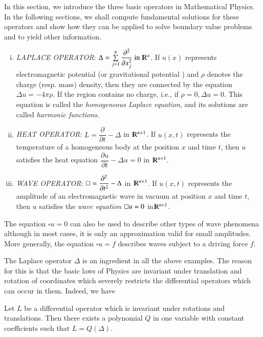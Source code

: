 In this section, we introduce the three basic operators in
Mathematical Physics. In the following sections, we shall compute
fundamental solutions for these operators and show how they can be
applied to solve boundary value problems and to yield other
information. 
\begin{enumerate}[(i)]
\item \textit{LAPLACE OPERATOR}: $\Delta = \sum \limits_{j=1}^n
  \dfrac{\partial ^2}{\partial x^2_j} ~\text{in}~ \varmathbb{R}^n$. If $u(x)$
  represents electromagnetic potential (or gravitational potential )
  and $\rho$ denotes the charge (resp. mass) density, then they are
  connected by the equation $\Delta u = - 4 \pi \rho$. If the region
  contains no charge, i.e., if $\rho = 0, \Delta u = 0$. This
  equation is called the \textit{homogeneous Laplace equation}, and
  its solutions are called \textit{harmonic functions}. 
\item \textit{HEAT OPERATOR}: $L = \dfrac{\partial}{\partial t} -
  \Delta $ in $\varmathbb{R}^{n+1}$. If $u(x, t)$ represents the
  temperature of a homogeneous body at the position $x$ and time $t$,
  then $u$ satisfies the heat equation $\dfrac{\partial u}{ \partial
    t} - \Delta u = 0 $ in $\varmathbb{R}^{n+1}$. 
\item \textit{WAVE OPERATOR}: $\oblong = \dfrac{\partial ^2}{\partial
  t ^2}- \Delta $ in $\varmathbb{R}^{n+1}$. If $u (x, t) $ represents
  the amplitude of an electromagnetic wave in vacuum at position $x$
  and time $t$, then $u$ satisfies the \textit{wave equation}
  $\oblong u = 0$ in\pageoriginale $\varmathbb{R}^{n+1}$. 
\end{enumerate}
The equation $\square u = 0$ can also be used to describe other types
of wave phenomena although in most cases, it is only an approximation
valid for small amplitudes. More generally, the equation $\square u =f
$ describes waves subject to a driving force $f$. 

The Laplace operator $\Delta$ is an ingredient in all the above
examples. The reason for this is that the basic laws of Physics are
invariant under translation and rotation of coordinates which severely
restricts the differential operators which can occur in them. Indeed,
we have 
\setcounter{thm}{12}
\begin{thm} \label{chap2:sec3:thm2.13}%
 Let $L$ be a differential operator which is invariant under
 rotations and translations. Then there exists a polynomial $Q$ in one
 variable with constant coefficients such that  $L= Q(\Delta) $. 
\end{thm} 

